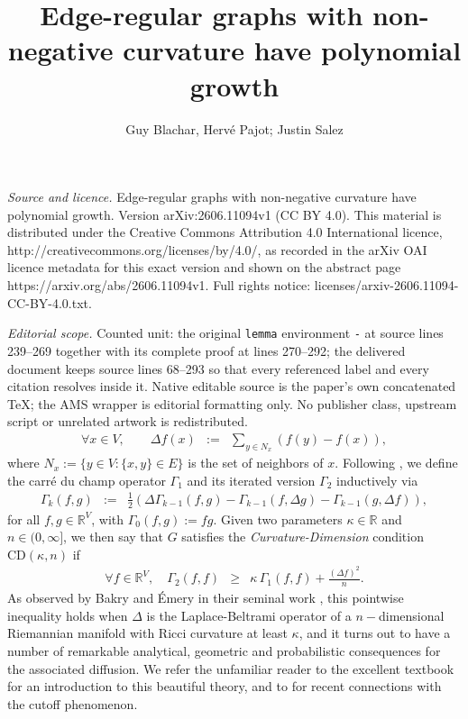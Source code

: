 \documentclass[10pt,a4paper]{amsart}
\newcommand{\dR}{\mathbb {R}}
\newcommand{\CD}{\mathrm{CD}}
\begin{document}
\title[Edge-regular graphs with non-negative curvature have polynom]{Edge-regular graphs with non-negative curvature have polynomial growth}
\author{Guy Blachar, Hervé Pajot; Justin Salez}
\date{}
\maketitle
\noindent\emph{Source and licence.} Edge-regular graphs with non-negative curvature have polynomial growth. Version arXiv:2606.11094v1 (CC BY 4.0). This material is distributed under the Creative Commons Attribution 4.0 International licence, http://creativecommons.org/licenses/by/4.0/, as recorded in the arXiv OAI licence metadata for this exact version and shown on the abstract page https://arxiv.org/abs/2606.11094v1. Full rights notice: licenses/arxiv-2606.11094-CC-BY-4.0.txt.\par\smallskip
\noindent\textit{Editorial scope.} Counted unit: the original \texttt{lemma} environment \texttt{-} at source lines 239--269 together with its complete proof at lines 270--292; the delivered document keeps source lines 68--293 so that every referenced label and every citation resolves inside it. Native editable source is the paper's own concatenated TeX; the AMS wrapper is editorial formatting only. No publisher class, upstream script or unrelated artwork is redistributed.
\begin{eqnarray}
\label{def:Delta}
\forall x\in V,\qquad \Delta f(x) & := & \sum_{y\in N_x}\left(f(y)-f(x)\right),
\end{eqnarray}
where $N_x:=\{y\in V\colon\{x,y\}\in E\}$ is the set of neighbors of $x$. Following \cite{MR889476,MR1665591,MR2644381}, we define the carré du champ operator $\Gamma_1$ and its iterated version $\Gamma_2$ inductively via
\begin{eqnarray}
\Gamma_{k}(f,g) & := & \frac{1}{2}\left(\Delta \Gamma_{k-1}(f,g)-\Gamma_{k-1}(f,\Delta g)-\Gamma_{k-1}(g,\Delta f)\right),
\end{eqnarray} 
for all $f,g\in\dR^V$, with $\Gamma_0(f,g):=fg$. Given two parameters $\kappa\in\dR$ and $n\in(0,\infty]$, we then say that  $G$ satisfies the \emph{Curvature-Dimension} condition $\CD(\kappa,n)$ if 
\begin{eqnarray}
\label{def:CD}
\forall f\in\dR^V,\quad 
\Gamma_2(f,f) & \ge & \kappa\, \Gamma_1(f,f) + \frac{(\Delta f)^2}{n}.
\end{eqnarray}As observed by Bakry and \'Emery in their seminal work \cite{MR889476}, this pointwise inequality holds when  $\Delta$ is the Laplace-Beltrami operator of a $n-$dimensional Riemannian manifold  with Ricci curvature at least $\kappa$, and it turns out to have a number of remarkable analytical, geometric and probabilistic consequences for the associated diffusion. We refer the unfamiliar reader to the excellent textbook \cite{MR3155209} for an introduction to this beautiful theory, and to  \cite{salez2025modernaspectsmarkovchains,Salez2026Cutoff,pedrotti2025newcutoffcriterionnonnegatively} for recent connections with the cutoff phenomenon. 
\end{document}

